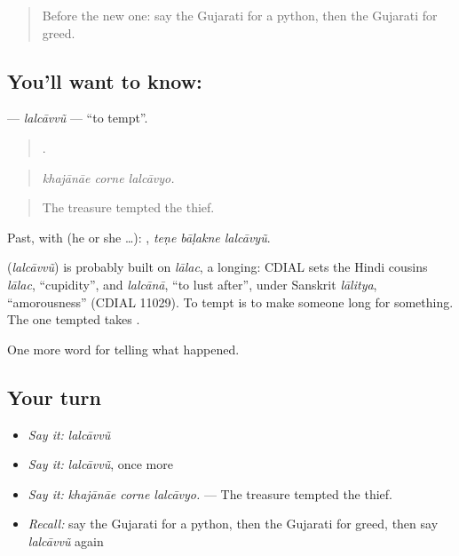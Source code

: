 \label{lesson:GU-C334-lalcavvu}



\begin{quote}
Before the new one: say the Gujarati for a python, then the Gujarati for greed.
\end{quote}

\subsection*{You'll want to know: }
\textbf{} — \emph{lalcāvvũ} — \textquotedblleft{}to tempt\textquotedblright{}.

\begin{quote}
  .
\end{quote}

\begin{quote}
\emph{khajānāe corne lalcāvyo.}
\end{quote}

\begin{quote}
The treasure tempted the thief.
\end{quote}

Past, with  (he or she …):   , \emph{teṇe bāḷakne lalcāvyũ}.

\begin{cousinweb}
\textbf{} (\emph{lalcāvvũ}) is probably built on \emph{lālac}, a longing: CDIAL sets the Hindi cousins \emph{lālac}, \textquotedblleft{}cupidity\textquotedblright{}, and \emph{lalcānā}, \textquotedblleft{}to lust after\textquotedblright{}, under Sanskrit \emph{lālitya}, \textquotedblleft{}amorousness\textquotedblright{} (CDIAL 11029). To tempt is to make someone long for something. The one tempted takes \textbf{}.
\end{cousinweb}

\begin{grammarlens}[title={What you've built}]
One more word for telling what happened.
\end{grammarlens}

\subsection*{Your turn}
\begin{itemize}
\raggedright
  \item \emph{Say it:} \emph{lalcāvvũ}
  \item \emph{Say it:} \emph{lalcāvvũ}, once more
  \item \emph{Say it:} \emph{khajānāe corne lalcāvyo.} — The treasure tempted the thief.
  \item \emph{Recall:} say the Gujarati for a python, then the Gujarati for greed, then say \emph{lalcāvvũ} again
\end{itemize}

